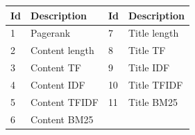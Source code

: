  
\begin{center}
\centering
\label{my-label}
\begin{tabular}{ll|ll}
Id & Description & Id & Description    \\ \hline
1  & Pagerank  & 7  & Title length     \\
2  & Content length & 8  & Title TF  \\
3  & Content TF  & 9  & Title IDF   \\
4  & Content IDF & 10 & Title TFIDF   \\
5  & Content TFIDF & 11 & Title BM25  \\
6  & Content BM25   \\
   
\end{tabular}
  \label{tab:setdescription} 
\end{center}




